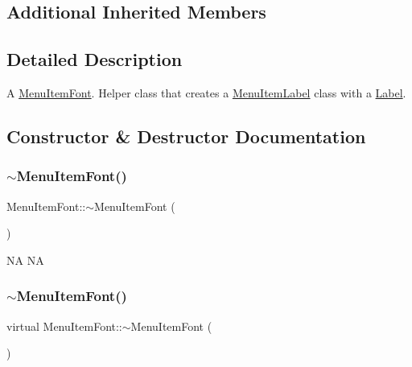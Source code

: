 \subsection*{Additional Inherited Members}


\subsection{Detailed Description}
A \hyperlink{classMenuItemFont}{Menu\+Item\+Font}. Helper class that creates a \hyperlink{classMenuItemLabel}{Menu\+Item\+Label} class with a \hyperlink{classLabel}{Label}. 

\subsection{Constructor \& Destructor Documentation}
\mbox{\label{classMenuItemFont_a2247b475527e0b457c3f01700abcf275}} 
\subsubsection{\texorpdfstring{$\sim$\+Menu\+Item\+Font()}{~MenuItemFont()}\hspace{0.1cm}{\footnotesize\ttfamily [1/2]}}
{\footnotesize\ttfamily Menu\+Item\+Font\+::$\sim$\+Menu\+Item\+Font (\begin{DoxyParamCaption}{ }\end{DoxyParamCaption})\hspace{0.3cm}{\ttfamily [virtual]}}

NA  NA \mbox{\label{classMenuItemFont_a39897c55a5ff14b10656b7609e942f2f}} 
\subsubsection{\texorpdfstring{$\sim$\+Menu\+Item\+Font()}{~MenuItemFont()}\hspace{0.1cm}{\footnotesize\ttfamily [2/2]}}
{\footnotesize\ttfamily virtual Menu\+Item\+Font\+::$\sim$\+Menu\+Item\+Font (\begin{DoxyParamCaption}{ }\end{DoxyParamCaption})\hspace{0.3cm}{\ttfamily [virtual]}}

